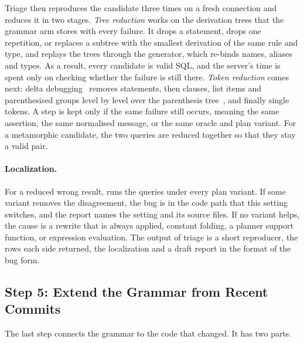 Triage then reproduces the candidate three times on a fresh connection and
reduces it in two stages. \emph{Tree reduction} works on the derivation trees
that the grammar arm stores with every failure. It drops a statement, drops one
repetition, or replaces a subtree with the smallest derivation of the same rule
and type, and replays the trees through the generator, which re-binds names,
aliases and types. As a result, every candidate is valid SQL, and the server's
time is spent only on checking whether the failure is still there. \emph{Token
reduction} comes next: delta debugging~\cite{zeller2002dd} removes statements,
then clauses, list items and parenthesised groups level by level over the
parenthesis tree~\cite{misherghi2006hdd}, and finally single tokens. A step is
kept only if the same failure still occurs, meaning the same assertion, the same
normalised message, or the same oracle and plan variant. For a metamorphic
candidate, the two queries are reduced together so that they stay a valid pair.

\paragraph{Localization.} For a reduced wrong result, \tool runs the queries
under every plan variant. If some variant removes the disagreement, the bug is
in the code path that this setting switches, and the report names the setting
and its source files. If no variant helps, the cause is a rewrite that is always
applied, constant folding, a planner support function, or expression evaluation.
The output of triage is a short reproducer, the rows each side returned, the
localization and a draft report in the format of the \pg bug form.

\subsection{Step 5: Extend the Grammar from Recent Commits}
\label{sec:llm}

The last step connects the grammar to the code that changed. It has two parts.

